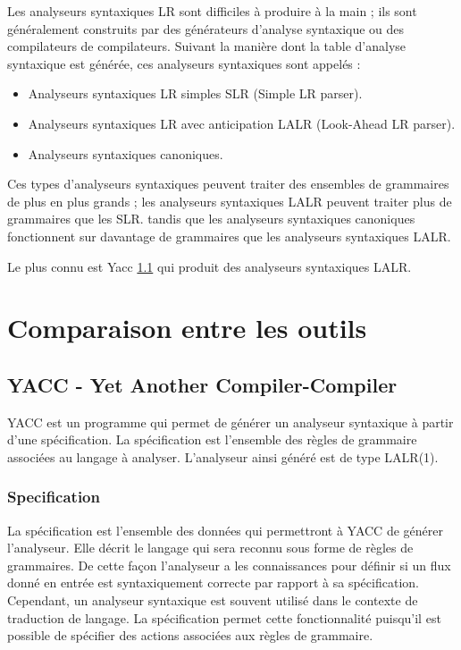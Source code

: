 \documentclass{article}
\begin{document}
Les analyseurs syntaxiques LR sont difficiles à produire à la main ; ils sont généralement construits par des générateurs d'analyse syntaxique ou des compilateurs de compilateurs. Suivant la manière dont la table d'analyse syntaxique est générée, ces analyseurs syntaxiques sont appelés : 
\begin{itemize}
\item Analyseurs syntaxiques LR simples SLR (Simple LR parser).
\item Analyseurs syntaxiques LR avec anticipation LALR (Look-Ahead LR parser).
\item Analyseurs syntaxiques canoniques.
\end{itemize} 

Ces types d'analyseurs syntaxiques peuvent traiter des ensembles de grammaires de plus en plus grands ; les analyseurs syntaxiques LALR peuvent traiter plus de grammaires que les SLR. tandis que les analyseurs syntaxiques canoniques fonctionnent sur davantage de grammaires que les analyseurs syntaxiques LALR. 

Le plus connu est Yacc \ref{sec:yacc} qui produit des analyseurs syntaxiques LALR.

\section{Comparaison entre les outils}
\label{hints}

\subsection{YACC - Yet Another Compiler-Compiler}
\label{sec:yacc}
YACC est un programme qui permet de générer un analyseur syntaxique à partir d’une spécification. La spécification est l’ensemble des règles de grammaire associées au langage à analyser.
L’analyseur ainsi généré est de type LALR(1).

\subsubsection{Specification}
La spécification est l’ensemble des données qui permettront à YACC de générer l’analyseur. Elle décrit le langage qui sera reconnu sous forme de règles de grammaires. De cette façon l’analyseur a les connaissances pour définir si un flux donné en entrée est syntaxiquement correcte par rapport à sa spécification.
Cependant, un analyseur syntaxique est souvent utilisé dans le contexte de traduction de langage. La spécification permet cette fonctionnalité puisqu’il est possible de spécifier des actions associées aux règles de grammaire.
\end{document}
